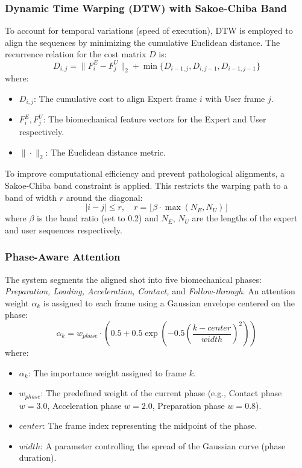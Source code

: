 \documentclass[pdflatex,sn-mathphys-num]{sn-jnl}%
\theoremstyle{thmstyleone}%
\theoremstyle{thmstyletwo}%
\theoremstyle{thmstylethree}%
\begin{document}
\subsubsection{Dynamic Time Warping (DTW) with Sakoe-Chiba Band}
To account for temporal variations (speed of execution), DTW is employed to align the sequences by minimizing the cumulative Euclidean distance. The recurrence relation for the cost matrix $D$ is:
\begin{equation}
D_{i,j} = \|F_{i}^{E} - F_{j}^{U}\|_2 + \min\{D_{i-1,j}, D_{i,j-1}, D_{i-1,j-1}\}
\end{equation}
\noindent where:
\begin{itemize}
    \item $D_{i,j}$: The cumulative cost to align Expert frame $i$ with User frame $j$.
    \item $F_{i}^{E}, F_{j}^{U}$: The biomechanical feature vectors for the Expert and User respectively.
    \item $\|\cdot\|_2$: The Euclidean distance metric.
\end{itemize}

To improve computational efficiency and prevent pathological alignments, a Sakoe-Chiba band constraint \cite{b42} is applied. This restricts the warping path to a band of width $r$ around the diagonal:
\begin{equation}
|i - j| \le r, \quad r = \lfloor \beta \cdot \max(N_E, N_U) \rfloor
\end{equation}
\noindent where $\beta$ is the band ratio (set to 0.2) and $N_E$, $N_U$ are the lengths of the expert and user sequences respectively.

\subsubsection{Phase-Aware Attention}
The system segments the aligned shot into five biomechanical phases: \textit{Preparation, Loading, Acceleration, Contact,} and \textit{Follow-through}. An attention weight $\alpha_k$ is assigned to each frame using a Gaussian envelope centered on the phase:
\begin{equation}
\alpha_{k} = w_{phase} \cdot \left(0.5 + 0.5\exp\left(-0.5\left(\frac{k-center}{width}\right)^{2}\right)\right)
\end{equation}
\noindent where:
\begin{itemize}
    \item $\alpha_k$: The importance weight assigned to frame $k$.
    \item $w_{phase}$: The predefined weight of the current phase (e.g., Contact phase $w=3.0$, Acceleration phase $w=2.0$, Preparation phase $w=0.8$).
    \item $center$: The frame index representing the midpoint of the phase.
    \item $width$: A parameter controlling the spread of the Gaussian curve (phase duration).
\end{itemize}
\end{document}
